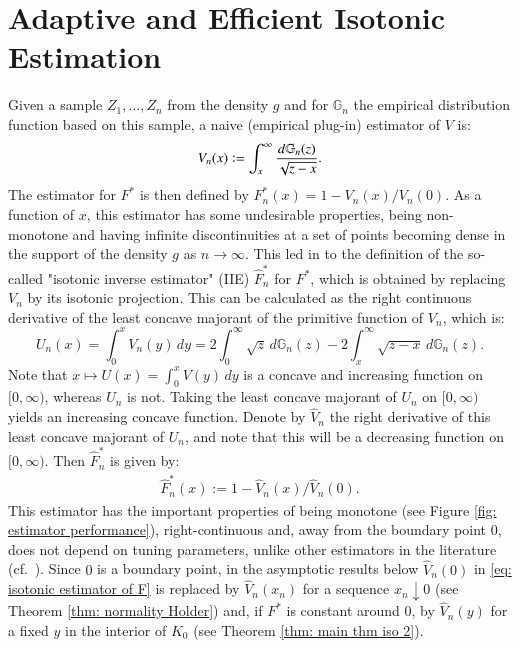 \section{Adaptive and Efficient Isotonic Estimation}

Given a sample $Z_1, \ldots, Z_n$ from the density $g$ and for $\mathbb{G}_n$ the empirical distribution function based on this sample, a naive (empirical plug-in) estimator of $V$ is:
\begin{align}\label{eq: naive estimator of V chapter2}
    V_n(x) \vcentcolon=\int_x^{\infty} \frac{d\mathbb{G}_n(z)}{\sqrt{z-x}}.
\end{align}
The estimator for $F^*$ is then defined by $F^*_n(x) = 1- V_n(x)/V_n(0)$. As a function of $x$, this estimator has some undesirable properties, being non-monotone and having infinite discontinuities at a set of points becoming dense in the support of the density $g$ as $n \rightarrow \infty$. This led in \cite{1} to the definition of the so-called "isotonic inverse estimator" (IIE) $\hat{F}^*_n$ for $F^*$, which is obtained by replacing $V_n$ by its isotonic projection. This can be calculated as the right continuous derivative of the least concave majorant of the primitive function of $V_n$, which is:
$$
U_n(x)=\int_0^x V_n(y) \, dy=2 \int_0^{\infty} \sqrt{z} \, d\mathbb{G}_n(z)-2 \int_x^{\infty} \sqrt{z-x} \, d \mathbb{G}_n(z).
$$
Note that $x \mapsto U(x) = \int_{0}^x V(y) \, dy$ is a concave and increasing function on $[0,\infty)$, whereas $U_n$ is not. Taking the least concave majorant of $U_n$ on $[0,\infty)$ yields an increasing concave function. Denote by $\hat{V}_n$ the right derivative of this least concave majorant of $U_n$, and note that this will be a decreasing function on $[0,\infty)$. Then $\hat{F}^*_n$ is given by: 
\begin{align}\label{eq: isotonic estimator of F}
\hat{F}^*_n(x) := 1 - \hat{V}_n(x)/\hat{V}_n(0).
\end{align}
This estimator has the important properties of being monotone (see Figure \ref{fig: estimator performance}), right-continuous and, away from the boundary point $0$, does not depend on tuning parameters, unlike other estimators in the literature (cf.\ \cite{10}). Since $0$ is a boundary point, in the asymptotic results below $\hat{V}_n(0)$ in \eqref{eq: isotonic estimator of F} is replaced by $\hat{V}_n(x_n)$ for a sequence $x_n \downarrow 0$ (see Theorem \ref{thm: normality Holder}) and, if $F^*$ is constant around $0$, by $\hat{V}_n(y)$ for a fixed $y$ in the interior of $K_0$ (see Theorem \ref{thm: main thm iso 2}).

